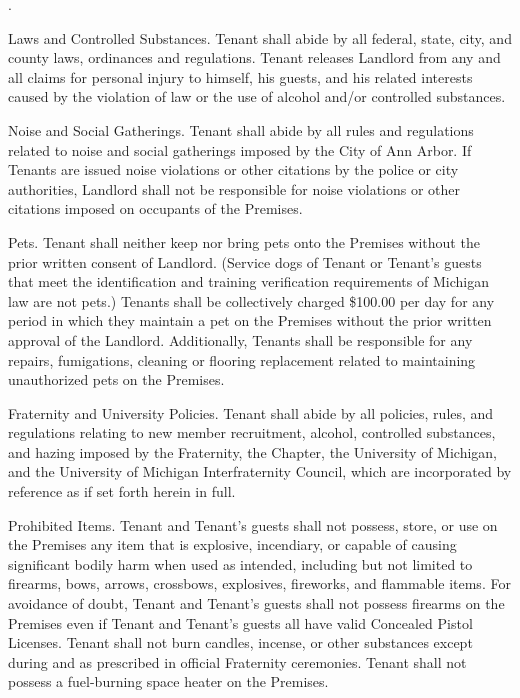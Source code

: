 \documentclass{article}
\begin{document}
\begin{compactList}{.}{}
  \item {\titleStyle Laws and Controlled Substances.} Tenant shall abide by all
  federal, state, city, and county laws, ordinances and regulations. Tenant
  releases Landlord from any and all claims for personal injury to himself, his
  guests, and his related interests caused by the violation of law or the use of
  alcohol and/or controlled substances.

  \item {\titleStyle Noise and Social Gatherings.} Tenant shall abide by all
  rules and regulations related to noise and social gatherings imposed by the
  City of Ann Arbor. If Tenants are issued noise violations or other citations
  by the police or city authorities, Landlord shall not be responsible for noise
  violations or other citations imposed on occupants of the Premises.

  \item {\titleStyle Pets.} Tenant shall neither keep nor bring pets onto the
  Premises without the prior written consent of Landlord. (Service dogs of
  Tenant or Tenant’s guests that meet the identification and training
  verification requirements of Michigan law are not pets.) Tenants shall be
  collectively charged \$100.00 per day for any period in which they maintain a
  pet on the Premises without the prior written approval of the Landlord.
  Additionally, Tenants shall be responsible for any repairs, fumigations,
  cleaning or flooring replacement related to maintaining unauthorized pets on
  the Premises.

  \item {\titleStyle Fraternity and University Policies.} Tenant shall abide by
  all policies, rules, and regulations relating to new member recruitment,
  alcohol, controlled substances, and hazing imposed by the Fraternity, the
  Chapter, the University of Michigan, and the University of Michigan
  Interfraternity Council, which are incorporated by reference as if set forth
  herein in full.

  \item {\titleStyle Prohibited Items.} Tenant and Tenant’s guests shall not
  possess, store, or use on the Premises any item that is explosive, incendiary,
  or capable of causing significant bodily harm when used as intended, including
  but not limited to firearms, bows, arrows, crossbows, explosives, fireworks,
  and flammable items. For avoidance of doubt, Tenant and Tenant’s guests shall
  not possess firearms on the Premises even if Tenant and Tenant’s guests all
  have valid Concealed Pistol Licenses. Tenant shall not burn candles, incense,
  or other substances except during and as prescribed in official Fraternity
  ceremonies. Tenant shall not possess a fuel-burning space heater on the
  Premises.


\end{compactList}
\end{document}
